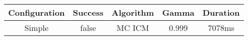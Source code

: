 \begin{tabular}{|c|c|c|c|c|}
\hline
Configuration & Success & Algorithm & Gamma & Duration\\
\hline
Simple & false & MC ICM & 0.999 & 7078ms\\
\hline
\end{tabular}